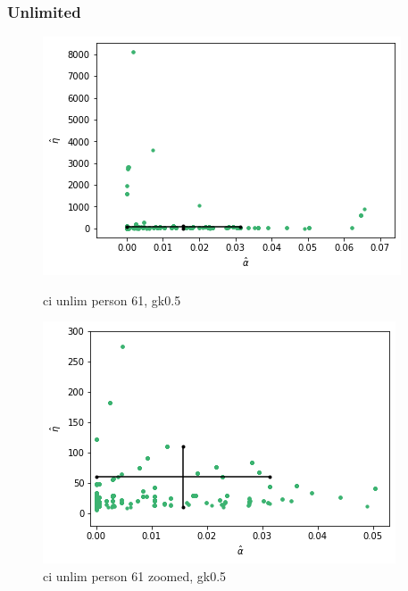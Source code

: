 \subsubsection{Unlimited}
\begin{figure}
    \centering
    \begin{minipage}{0.48\textwidth}
        \centering
        \includegraphics[scale=0.37]{pictures/Gamma=kappa=0.5/ci_unlim_person61_gk0.5.png}
        \caption{ci unlim person 61, gk0.5}
        \label{fig:ci_unlim_person_61_gk0.5}
    \end{minipage}\hfill
    \begin{minipage}{0.48\textwidth}
        \centering
        \includegraphics[scale=0.37]{pictures/Gamma=kappa=0.5/ci_unlim_person61_gk0.5_zoomed.png}
        \caption{ci unlim person 61 zoomed, gk0.5}
        \label{fig:ci_unlim_person_61_zoomed_gk0.5}
    \end{minipage}
\end{figure}